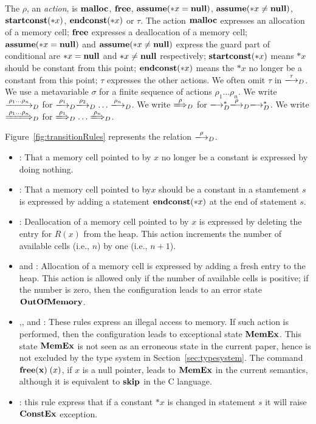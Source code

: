 The \(\rho\), an \emph{action}, is \(\mathbf{malloc}\), \(\mathbf{free}\), \(\mathbf{assume}(*x = \mathbf{null})\),
\(\mathbf{assume}(*x \ne \mathbf{null})\), \(\mathbf{startconst}(*x)\), \(\mathbf{endconst}(*x) \) or \(\tau\).  The action
\(\mathbf{malloc}\) expresses an allocation of a memory cell; \(\mathbf{free}\)
expresses a deallocation of a memory cell; \(\mathbf{assume}(*x = \mathbf{null})\) and \(\mathbf{assume}(*x \ne \mathbf{null})\)
express the guard part of conditional are \( *x = \mathbf{null} \) and \(*x \ne \mathbf{null}\)
respectively; \(\mathbf{startconst}(*x)\) means \(*x\) should be constant from
this point; \(\mathbf{endconst}(*x)\) means the \(*x\) no longer be a constant
from this point; \(\tau\) expresses the other actions.  We often omit
\(\tau\) in \(\xlongrightarrow{\tau}_D\).  We use a metavariable
\(\sigma\) for a finite sequence of actions \(\rho_1\dots\rho_n\).  We
write \(\xlongrightarrow{\rho_1\dots\rho_n}_D\) for
\(\xlongrightarrow{\rho_1}_D\xlongrightarrow{\rho_2}_D\dots\xlongrightarrow{\rho_n}_D\).
We write \(\xLongrightarrow{\rho}_D\) for
\(\xlongrightarrow{}_D^*\xlongrightarrow{\rho}_D\xlongrightarrow{}_D^*\).
We write \(\xLongrightarrow{\rho_1\dots\rho_n}_D\) for
\(\xLongrightarrow{\rho_1}_D\dots\xLongrightarrow{\rho_n}_D\).

Figure~\ref{fig:transitionRules} represents the relation \(\xlongrightarrow{\rho}_D\).

\begin{itemize}
\item {}: That a memory cell pointed to by \(x\) no
  longer be a constant is expressed by doing nothing.
\item {}: That a memory cell pointed to by\(x\) should
  be a constant in a stamtement \(s\) is expressed by adding a statement \(\mathbf{endconst}(*x)\) at the end of statement \(s\).
\item {}: Deallocation of a memory cell pointed to by \(x\)
  is expressed by deleting the entry for \(R(x)\) from the heap.  This
  action increments the number of available cells (i.e., \(n\)) by one
  (i.e., \(n+1\)).
\item {} and : Allocation of a memory
  cell is expressed by adding a fresh entry to the heap.  This action is
  allowed only if the number of available cells is positive; if the
  number is zero, then the configuration leads to an error state
  \(\mathbf{OutOfMemory}\).
\item {},, and
   : These rules express an illegal access to memory.
  If such action is performed, then the configuration leads to
  exceptional state \(\mathbf{MemEx}\).  This state \(\mathbf{MemEx}\) is not seen as
  an erroneous state in the current paper, hence is not excluded by
  the type system in Section~\ref{sec:typesystem}.  The command
  \(\mathbf{free(x)}\;(x)\), if \(x\) is a null pointer, leads to \(\mathbf{MemEx}\) in the
  current semantics, although it is equivalent to \(\mathbf{skip}\) in the C
  language.
\item {}: this rule express that if a constant \(*x\)
  is changed in statement \(s\) it will raise \(\mathbf{ConstEx}\) exception.

  
\end{itemize}

